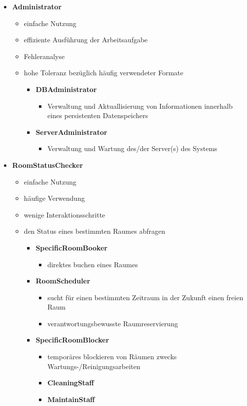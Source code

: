 \begin{itemize}
	\item \textbf{Administrator}
	\begin{itemize}
		\item einfache Nutzung
		\item effiziente Ausführung der Arbeitsaufgabe
		\item Fehleranalyse
		\item hohe Toleranz bezüglich häufig verwendeter Formate
		\begin{itemize}
			\item \textbf{DBAdministrator}
			\begin{itemize}
				\item Verwaltung und Aktuallisierung von Informationen innerhalb eines persistenten Datenspeichers
			\end{itemize}
			\item \textbf{ServerAdministrator}
			\begin{itemize}
				\item Verwaltung und Wartung des/der Server(s) des Systems
			\end{itemize}
		\end{itemize}
	\end{itemize}
	
	\item \textbf{RoomStatusChecker}
	\begin{itemize}
		\item einfache Nutzung
		\item häufige Verwendung
		\item wenige Interaktionsschritte
		\item den Status eines bestimmten Raumes abfragen
		\begin{itemize}
			\item \textbf{SpecificRoomBooker}
			\begin{itemize}
				\item direktes buchen eines Raumes
			\end{itemize}
			\item \textbf{RoomScheduler}
			\begin{itemize}
				\item sucht für einen bestimmten Zeitraum in der Zukunft einen freien Raum
				\item verantwortungsbewusste Raumreservierung
			\end{itemize}
			\item \textbf{SpecificRoomBlocker}
			\begin{itemize}
				\item temporäres blockieren von Räumen zwecks Wartungs-/Reinigungsarbeiten
				\item \textbf{CleaningStaff}
				\item \textbf{MaintainStaff}
			\end{itemize}
		\end{itemize}
	\end{itemize}
\end{itemize}

